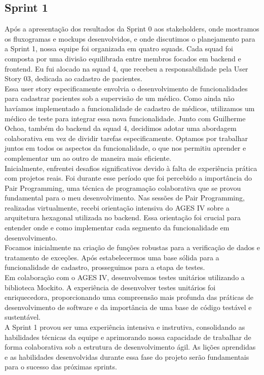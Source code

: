 \subsection{Sprint 1}

Após a apresentação dos resultados da Sprint 0 aos stakeholders, onde mostramos os fluxogramas e mockups desenvolvidos, e onde discutimos o planejamento para a Sprint 1, nossa equipe foi organizada em quatro squads. Cada squad foi composta por uma divisão equilibrada entre membros focados em backend e frontend. Eu fui alocado na squad 4, que recebeu a responsabilidade pela User Story 03, dedicada ao cadastro de pacientes.\\

Essa user story especificamente envolvia o desenvolvimento de funcionalidades para cadastrar pacientes sob a supervisão de um médico. Como ainda não havíamos implementado a funcionalidade de cadastro de médicos, utilizamos um médico de teste para integrar essa nova funcionalidade. Junto com Guilherme Ochoa, também do backend da squad 4, decidimos adotar uma abordagem colaborativa em vez de dividir tarefas especificamente. Optamos por trabalhar juntos em todos os aspectos da funcionalidade, o que nos permitiu aprender e complementar um ao outro de maneira mais eficiente.\\

Inicialmente, enfrentei desafios significativos devido à falta de experiência prática com projetos reais. Foi durante esse período que foi percebido a importância do Pair Programming, uma técnica de programação colaborativa que se provou fundamental para o meu desenvolvimento. Nas sessões de Pair Programming, realizadas virtualmente, recebi orientação intensiva do AGES IV sobre a arquitetura hexagonal utilizada no backend. Essa orientação foi crucial para entender onde e como implementar cada segmento da funcionalidade em desenvolvimento.\\

Focamos inicialmente na criação de funções robustas para a verificação de dados e tratamento de exceções. Após estabelecermos uma base sólida para a funcionalidade de cadastro, prosseguimos para a etapa de testes.\\

Em colaboração com o AGES IV, desenvolvemos testes unitários utilizando a biblioteca Mockito. A experiência de desenvolver testes unitários foi enriquecedora, proporcionando uma compreensão mais profunda das práticas de desenvolvimento de software e da importância de uma base de código testável e sustentável.\\

A Sprint 1 provou ser uma experiência intensiva e instrutiva, consolidando as habilidades técnicas da equipe e aprimorando nossa capacidade de trabalhar de forma colaborativa sob a estrutura de desenvolvimento ágil. As lições aprendidas e as habilidades desenvolvidas durante essa fase do projeto serão fundamentais para o sucesso das próximas sprints.